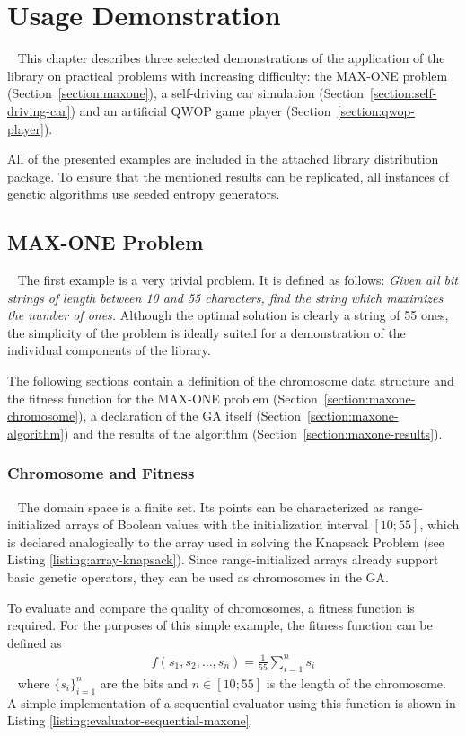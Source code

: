\chapter{Usage Demonstration}~\label{chapter:usage-demo}
This chapter describes three selected demonstrations of the application of the library on practical problems with increasing difficulty: the MAX-ONE problem (Section~\ref{section:maxone}), a self-driving car simulation (Section~\ref{section:self-driving-car}) and an artificial QWOP game player (Section~\ref{section:qwop-player}).

All of the presented examples are included in the attached library distribution package. To ensure that the mentioned results can be replicated, all instances of genetic algorithms use seeded entropy generators.

\section{MAX-ONE Problem}~\label{section:maxone}
The first example is a very trivial problem. It is defined as follows: \textit{Given all bit strings of length between 10 and 55 characters, find the string which maximizes the number of ones.} Although the optimal solution is clearly a string of 55 ones, the simplicity of the problem is ideally suited for a demonstration of the individual components of the library.

The following sections contain a definition of the chromosome data structure and the fitness function for the MAX-ONE problem (Section~\ref{section:maxone-chromosome}), a declaration of the GA itself (Section~\ref{section:maxone-algorithm}) and the results of the algorithm (Section~\ref{section:maxone-results}).

\subsection{Chromosome and Fitness}~\label{section:maxone-chromosome}
The domain space is a finite set. Its points can be characterized as range-initialized arrays of Boolean values with the initialization interval $[10;55]$, which is declared analogically to the array used in solving the Knapsack Problem (see Listing \ref{listing:array-knapsack}). Since range-initialized arrays already support basic genetic operators, they can be used as chromosomes in the GA.

To evaluate and compare the quality of chromosomes, a fitness function is required. For the purposes of this simple example, the fitness function can be defined as
~
\begin{align}
	f(s_1, s_2, \dots, s_{n}) = \frac{1}{55}\sum_{i=1}^{n} s_i
\end{align}
~
where $\{s_i\}_{i=1}^{n}$ are the bits and $n\in[10;55]$ is the length of the chromosome. A simple implementation of a sequential evaluator using this function is shown in Listing \ref{listing:evaluator-sequential-maxone}.

